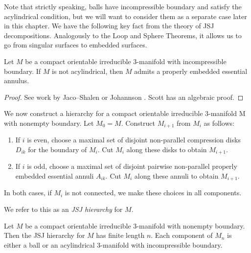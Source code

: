 Note that strictly speaking, balls have incompressible boundary and satisfy the
acylindrical condition, but we will want to consider them as a separate case
later in this chapter. We have the following key fact from the theory of JSJ
decompositions.  Analogously to the Loop and Sphere Theorems, it allows us to
go from singular surfaces to embedded surfaces.

\begin{thm}

Let $M$ be a compact orientable irreducible $3$-manifold with incompressible
boundary. If $M$ is not acylindrical, then $M$ admits a properly embedded
essential annulus.

\end{thm}

\begin{proof}

See work by Jaco--Shalen \cite{JacoShalen} or Johannson \cite{Johannson}. Scott
\cite{Scottannulus} has an algebraic proof.

\end{proof}

We now construct a hierarchy for a compact orientable irreducible $3$-manifold
M with nonempty boundary.  Let $M_0 = M$.  Construct $M_{i+1}$ from $M_i$ as
follows:

\begin{enumerate}

\item If $i$ is even, choose a maximal set of disjoint non-parallel compression
disks $D_{ik}$ for the boundary of $M_i$. Cut $M_i$ along these disks to obtain
$M_{i+1}$.

\item If $i$ is odd, choose a maximal set of disjoint pairwise non-parallel
properly embedded essential annuli $A_{ik}$. Cut $M_i$ along these annuli to
obtain $M_{i+1}$.

\end{enumerate}

In both cases, if $M_i$ is not connected, we make these choices in all
components.

\begin{defn}

We refer to this as an \emph{JSJ hierarchy} for $M$.

\end{defn}

\begin{lemma}

Let $M$ be a compact orientable irreducible $3$-manifold with nonempty
boundary.  Then the JSJ hierarchy for $M$ has finite length $n$. Each
component of $M_n$ is either a ball or an acylindrical $3$-manifold with
incompressible boundary.

\end{lemma}

